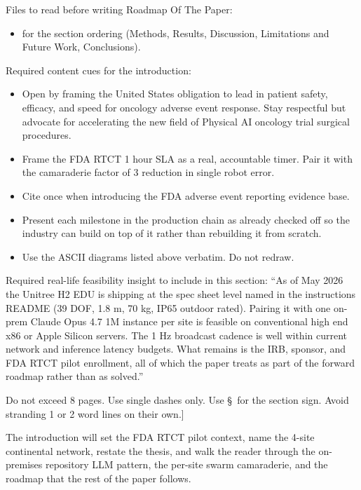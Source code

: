 \begin{sectionaccent}
Files to read before writing Roadmap Of The Paper:
\begin{itemize}
  \item {}
        for the section ordering (Methods, Results, Discussion,
        Limitations and Future Work, Conclusions).
\end{itemize}

Required content cues for the introduction:
\begin{itemize}
  \item Open by framing the United States obligation to lead in patient
        safety, efficacy, and speed for oncology adverse event
        response. Stay respectful but advocate for accelerating the
        new field of Physical AI oncology trial surgical procedures.
  \item Frame the FDA RTCT 1 hour SLA as a real, accountable timer.
        Pair it with the camaraderie factor of 3 reduction in single
        robot error.
  \item Cite  once when introducing the
        FDA adverse event reporting evidence base.
  \item Present each milestone in the production chain as already
        checked off so the industry can build on top of it rather
        than rebuilding it from scratch.
  \item Use the ASCII diagrams listed above verbatim. Do not redraw.
\end{itemize}

Required real-life feasibility insight to include in this section:
``As of May 2026 the Unitree H2 EDU is shipping at the spec sheet level
named in the instructions README (39 DOF, 1.8 m, 70 kg, IP65 outdoor
rated). Pairing it with one on-prem Claude Opus 4.7 1M instance per
site is feasible on conventional high end x86 or Apple Silicon
servers. The 1 Hz broadcast cadence is well within current network and
inference latency budgets. What remains is the IRB, sponsor, and FDA
RTCT pilot enrollment, all of which the paper treats as part of the
forward roadmap rather than as solved.''

Do not exceed 8 pages. Use single dashes only. Use \S\ for the section
sign. Avoid stranding 1 or 2 word lines on their own.]

The introduction will set the FDA RTCT pilot context, name the 4-site
continental network, restate the thesis, and walk the reader through
the on-premises repository LLM pattern, the per-site swarm camaraderie,
and the roadmap that the rest of the paper follows.


\end{sectionaccent}
